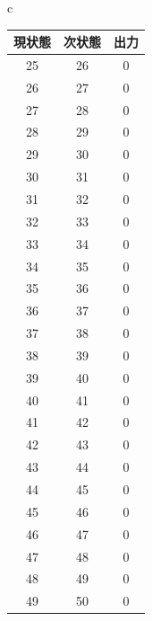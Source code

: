 \documentclass[a4paper]{jarticle}
\begin{document}
\begin{table}[H]
\begin{center}
\begin{tabular}{c}
\begin{minipage}{0.5\hsize}
\begin{center}
\begin{tabular}{|c|c|c|}
					\hline
					現状態	&次状態	&出力\\	\hline\hline
					25	&26	&0\\	\hline
					26	&27	&0\\	\hline
					27	&28	&0\\	\hline
					28	&29	&0\\	\hline
					29	&30	&0\\	\hline
					30	&31	&0\\	\hline
					31	&32	&0\\	\hline
					32	&33	&0\\	\hline
					33	&34	&0\\	\hline
					34	&35	&0\\	\hline
					35	&36	&0\\	\hline
					36	&37	&0\\	\hline
					37	&38	&0\\	\hline
					38	&39	&0\\	\hline
					39	&40	&0\\	\hline
					40	&41	&0\\	\hline
					41	&42	&0\\	\hline
					42	&43	&0\\	\hline
					43	&44	&0\\	\hline
					44	&45	&0\\	\hline
					45	&46	&0\\	\hline
					46	&47	&0\\	\hline
					47	&48	&0\\	\hline
					48	&49	&0\\	\hline
					49	&50	&0\\	\hline
					\end{tabular}
				\end{center}
			\end{minipage}
		\end{tabular}
	\end{center}
\end{table}
\end{document}
